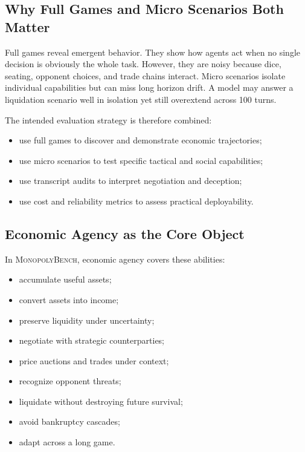 \documentclass[conference]{IEEEtran}
\newcommand{\Bench}{\textsc{MonopolyBench}}
\begin{document}
\subsection{Why Full Games and Micro Scenarios Both Matter}

Full games reveal emergent behavior. They show how agents act when no single decision is obviously the whole task. However, they are noisy because dice, seating, opponent choices, and trade chains interact. Micro scenarios isolate individual capabilities but can miss long horizon drift. A model may answer a liquidation scenario well in isolation yet still overextend across 100 turns.

The intended evaluation strategy is therefore combined:

\begin{itemize}
    \item use full games to discover and demonstrate economic trajectories;
    \item use micro scenarios to test specific tactical and social capabilities;
    \item use transcript audits to interpret negotiation and deception;
    \item use cost and reliability metrics to assess practical deployability.
\end{itemize}

\subsection{Economic Agency as the Core Object}

In \Bench, economic agency covers these abilities:

\begin{itemize}
    \item accumulate useful assets;
    \item convert assets into income;
    \item preserve liquidity under uncertainty;
    \item negotiate with strategic counterparties;
    \item price auctions and trades under context;
    \item recognize opponent threats;
    \item liquidate without destroying future survival;
    \item avoid bankruptcy cascades;
    \item adapt across a long game.
\end{itemize}
\end{document}
